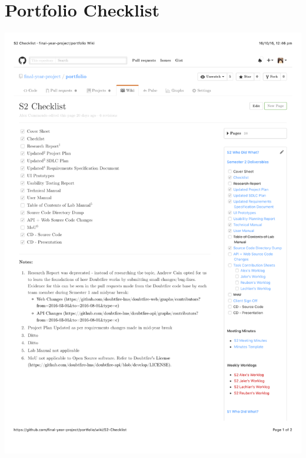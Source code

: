 \documentclass[12pt,a4paper,]{article}
\date{}
\begin{document}
\section{Portfolio Checklist}

\includegraphics[scale=1.2]{checklist.pdf}
\end{document}
